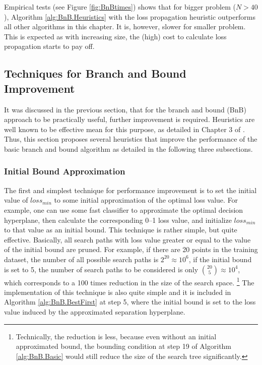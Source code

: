  
Empirical tests (see Figure \ref{fig:BnBtimes}) shows that for bigger
problem ($N>40$), Algorithm \ref{alg:BnB.Heuristics} with the loss
propagation heuristic outperforms all other algorithms in this
chapter. It is, however, slower for smaller problem. This is expected
as with increasing size, the (high) cost to calculate loss propagation
starts to pay off.



\subsection{Techniques for Branch and Bound Improvement}
\label{sec:bnb.improvement}

It was discussed in the previous section, that for the branch and
bound (BnB) approach to be practically useful, further improvement is
required. Heuristics are well known to be effective mean for this
purpose, as detailed in Chapter 3 of \cite{russell}. Thus, this
section proposes several heuristics that improve the performance of
the basic branch and bound algorithm as detailed in the following
three subsections.

\subsubsection{Initial Bound Approximation}
\label{sec:bnb.ordering}

The first and simplest technique for performance improvement is to set
the initial value of $loss_{min}$ to some initial approximation of the
optimal loss value. For example, one can use some fast classifier to
approximate the optimal decision hyperplane, then calculate the
corresponding 0--1 loss value, and initialize $loss_{min}$ to that
value as an initial bound. This technique is rather simple, but quite
effective. Basically, all search paths with loss value greater or
equal to the value of the initial bound are pruned. For example, if
there are 20 points in the training dataset, the number of all
possible search paths is $2^{20} \approx 10^6$, if the initial bound
is set to 5, the number of search paths to be considered is only ${20
  \choose 5} \approx 10^4$, which corresponds to a 100 times reduction
in the size of the search space. \footnote{Technically, the reduction
  is less, because even without an initial approximated bound, the
  bounding condition at step 19 of Algorithm \ref{alg:BnB.Basic} would
  still reduce the size of the search tree significantly.} The
implementation of this technique is also quite simple and it is
included in Algorithm \ref{alg:BnB.BestFirst} at step 5, where the
initial bound is set to the loss value induced by the approximated
separation hyperplane.


